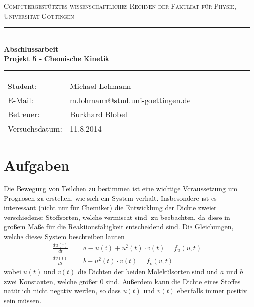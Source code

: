 \documentclass[12pt,a4paper,titlepage,headinclude,bibtotoc]{scrartcl}
\begin{document}
\begin{titlepage}
\centering
\textsc{\Large Computergestütztes wissenschaftliches Rechnen der Fakultät für
  Physik,\\[1.5ex] Universität Göttingen}

\vspace*{4.2cm}

\rule{\textwidth}{1pt}\\[0.5cm]
{\huge \bfseries
  Abschlussarbeit\\[1.5ex]
  Projekt 5 - Chemische Kinetik}\\[0.5cm]
\rule{\textwidth}{1pt}

\vspace*{3.5cm}

\begin{Large}
\begin{tabular}{ll}
Student: &  Michael Lohmann\\
E-Mail: & m.lohmann@stud.uni-goettingen.de\\
Betreuer: & Burkhard Blobel \\
Versuchsdatum: & 11.8.2014\\
\end{tabular}
\end{Large}

\vspace*{0.8cm}

\begin{Large}
\end{Large}

\end{titlepage}

\tableofcontents

\newpage

\section{Aufgaben}
Die Bewegung von Teilchen zu bestimmen ist eine wichtige Voraussetzung um Prognosen zu erstellen, wie sich ein System verhält.
Insbesondere ist es interessant (nicht nur für Chemiker) die Entwicklung der Dichte zweier verschiedener Stoffsorten, welche vermischt sind, zu beobachten, da diese in großem Maße für die Reaktionsfähigkeit entscheidend sind.
Die Gleichungen, welche dieses System beschreiben lauten
\begin{align}
\frac{du(t)}{dt}&=a-u(t)+u^2(t)\cdot v(t)=f_u(u,t)\\
\frac{dv(t)}{dt}&=b-u^2(t)\cdot v(t)=f_v(v,t)
\end{align}
wobei $u(t)$ und $v(t)$ die Dichten der beiden Molekülsorten sind und $a$ und $b$ zwei Konstanten, welche größer 0 sind. Außerdem kann die Dichte eines Stoffes natürlich nicht negativ werden, so dass $u(t)$ und $v(t)$ ebenfalls immer positiv sein müssen.\\
\end{document}
